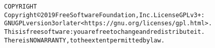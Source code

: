 \begin{alltt}
COPYRIGHT
       Copyright \copyright 2019 Free Software Foundation, Inc.  License GPLv3+:
  GNU GPL version 3 or later <https://gnu.org/licenses/gpl.html>.
       This is free software: you are free to change and redistribute it.
  There is NO WARRANTY, to the extent permitted by law.

\end{alltt}
